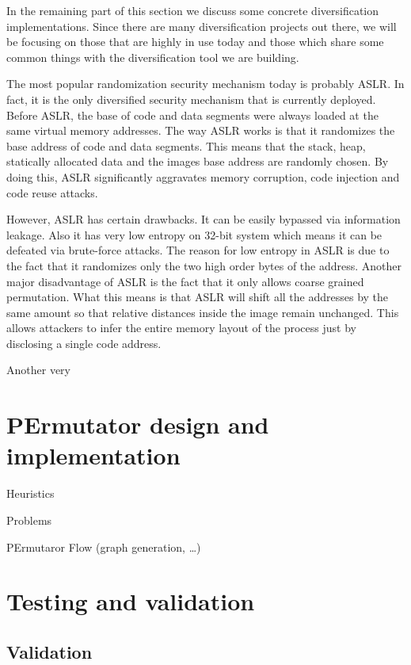 \documentclass[11pt,final,conference,a4paper]{IEEEtran}
\begin{document}
In the remaining part of this section we discuss some concrete diversification implementations. Since there are many diversification projects out there, we will be focusing on those that are highly in use today and those which share some common things with the diversification tool we are building.

The most popular randomization security mechanism today is probably ASLR. In fact, it is the only diversified security mechanism that is currently deployed. Before ASLR, the base of code and data segments were always loaded at the same virtual memory addresses. The way ASLR works is that it randomizes the base address of code and data segments. This means that the stack, heap, statically allocated data and the images base address are randomly chosen. By doing this, ASLR significantly aggravates memory corruption, code injection and code reuse attacks. 

However, ASLR has certain drawbacks. It can be easily bypassed via information leakage. Also it has very low entropy on 32-bit system which means it can be defeated via brute-force attacks. The reason for low entropy in ASLR is due to the fact that it randomizes only the two high order bytes of the address. Another major disadvantage of ASLR is the fact that it only allows coarse grained permutation. What this means is that ASLR will shift all the addresses by the same amount so that relative distances inside the image remain unchanged. This allows attackers to infer the entire memory layout of the process just by disclosing a single code address.

Another very 

\section{PErmutator design and implementation}
\label{sec:design}

Heuristics

Problems

PErmutaror Flow (graph generation, \ldots)

\section{Testing and validation}
\label{sec:testing}

\subsection{Validation}
\end{document}
